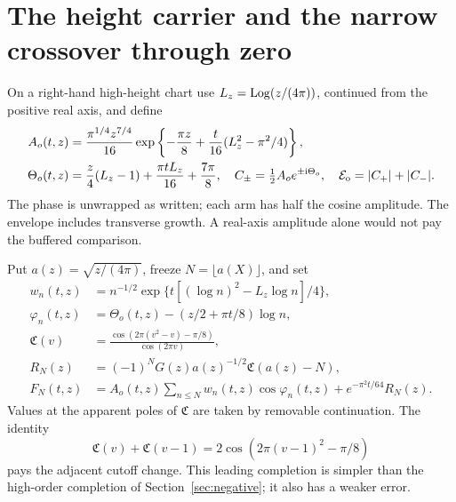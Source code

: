 \section{The height carrier and the narrow crossover through zero}
\label{sec:crossover}

On a right-hand high-height chart use $L_z=\operatorname{Log}(z/(4\pi))$, continued
from the positive real axis, and define
\begin{align}
 A_o(t,z)&=\frac{\pi^{1/4}z^{7/4}}{16}
  \exp\left\{-\frac{\pi z}8+\frac t{16}(L_z^2-\pi^2/4)\right\},\\
 \Theta_o(t,z)&=\frac z4(L_z-1)+\frac{\pi tL_z}{16}+\frac{7\pi}8,
 \quad C_\pm=\tfrac12 A_o e^{\pm\mathrm i\Theta_o},
 \quad \mathcal E_{\mathrm o}=|C_+|+|C_-|.
 \label{eq:outer-arms}
\end{align}
The phase is unwrapped as written; each arm has half the cosine
amplitude. The envelope includes transverse growth. A real-axis
amplitude alone would not pay the buffered comparison.

Put $a(z)=\sqrt{z/(4\pi)}$, freeze $N=\lfloor a(X)\rfloor$, and set
\begin{align*}
 w_n(t,z)&=n^{-1/2}\exp\{t[(\log n)^2-L_z\log n]/4\},\\
 \varphi_n(t,z)&=\Theta_o(t,z)-(z/2+\pi t/8)\log n,\\
 \mathfrak C(v)&=\frac{\cos(2\pi(v^2-v)-\pi/8)}{\cos(2\pi v)},\\
 R_N(z)&=(-1)^N G(z)a(z)^{-1/2}\mathfrak C(a(z)-N),\\
 F_N(t,z)&=A_o(t,z)\sum_{n\le N}w_n(t,z)\cos\varphi_n(t,z)
                           +e^{-\pi^2t/64}R_N(z).
\end{align*}
Values at the apparent poles of $\mathfrak C$ are taken by removable
continuation. The identity
\begin{equation}
 \mathfrak C(v)+\mathfrak C(v-1)
        =2\cos(2\pi(v-1)^2-\pi/8)
 \label{eq:cutoff-identity}
\end{equation}
pays the adjacent cutoff change. This leading completion is simpler
than the high-order completion of Section~\ref{sec:negative}; it also
has a weaker error.

